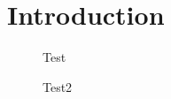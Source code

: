 \section{Introduction}

\begin{figure}[h]
\centering

\caption{Test} \label{fig:test}
\end{figure}

\begin{figure}[h]
\centering

\caption{Test2} \label{fig:test2}
\end{figure}
